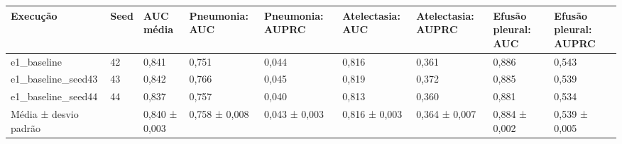 \begin{tabular}{lllllllll}
\toprule
Execução & Seed & AUC média & Pneumonia: AUC & Pneumonia: AUPRC & Atelectasia: AUC & Atelectasia: AUPRC & Efusão pleural: AUC & Efusão pleural: AUPRC \\
\midrule
e1\_baseline & 42 & 0,841 & 0,751 & 0,044 & 0,816 & 0,361 & 0,886 & 0,543 \\
e1\_baseline\_seed43 & 43 & 0,842 & 0,766 & 0,045 & 0,819 & 0,372 & 0,885 & 0,539 \\
e1\_baseline\_seed44 & 44 & 0,837 & 0,757 & 0,040 & 0,813 & 0,360 & 0,881 & 0,534 \\
Média ± desvio padrão &  & 0,840 ± 0,003 & 0,758 ± 0,008 & 0,043 ± 0,003 & 0,816 ± 0,003 & 0,364 ± 0,007 & 0,884 ± 0,002 & 0,539 ± 0,005 \\
\bottomrule
\end{tabular}
